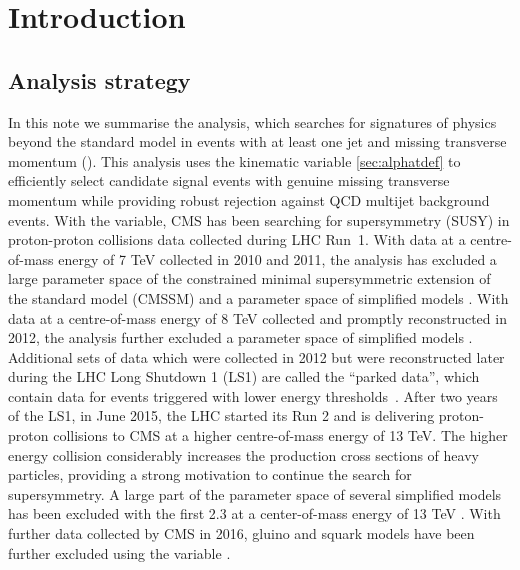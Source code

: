 \section{Introduction}
\label{sec:intro}

\subsection{Analysis strategy}
\label{sec:analysis-strategy}

In this note we summarise the \alphat analysis, which searches for
signatures of physics beyond the standard model in events with at least one jet 
and missing transverse momentum (\met). This analysis uses the
kinematic variable \alphat \ref{sec:alphatdef} to efficiently select candidate signal
events with genuine missing transverse momentum while providing robust
rejection against QCD multijet background events. With the \alphat
variable, CMS has been searching for supersymmetry (SUSY) in
proton-proton collisions data collected during LHC Run~1. With data at
a centre-of-mass energy of 7 TeV collected in 2010 and 2011, the
\alphat analysis has excluded a large parameter space of the
constrained minimal supersymmetric extension of the standard model
(CMSSM) \cite{Khachatryan:2011tk, Chatrchyan:2011zy,
Chatrchyan:2012wa} and a parameter space of simplified models
\cite{Chatrchyan:2012wa}. With data at a centre-of-mass energy of 8
TeV collected and promptly reconstructed in 2012, the \alphat analysis
further excluded a parameter space of simplified models
\cite{Chatrchyan:2013lya}. Additional sets of data which were
collected in 2012 but were reconstructed later during the LHC Long
Shutdown 1 (LS1) are called the ``parked data'', which contain data
for events triggered with lower energy
thresholds~\cite{Khachatryan:2016pxa}. 
After two years of the LS1, in June 2015, the LHC started its Run 2 and is
delivering proton-proton collisions to CMS at a higher centre-of-mass
energy of 13 TeV. The higher energy collision considerably increases
the production cross sections of heavy particles, providing a strong
motivation to continue the search for supersymmetry.
A large part of the parameter space of several simplified models has been excluded 
with the first 2.3 \ifb at a center-of-mass energy of 13 TeV \cite{Khachatryan:2016dvc}. 
With further data collected by CMS in 2016, gluino and squark models have 
been further excluded using the \alphat variable \cite{CMS-PAS-SUS-16-016}.

